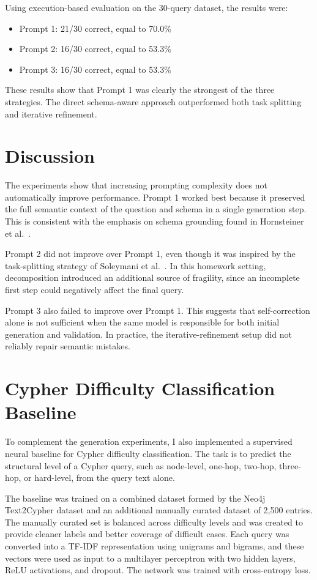\documentclass{article}
\begin{document}
Using execution-based evaluation on the 30-query dataset, the results were:
\begin{itemize}
    \item Prompt 1: 21/30 correct, equal to 70.0\%
    \item Prompt 2: 16/30 correct, equal to 53.3\%
    \item Prompt 3: 16/30 correct, equal to 53.3\%
\end{itemize}

These results show that Prompt 1 was clearly the strongest of the three strategies. The direct schema-aware approach outperformed both task splitting and iterative refinement.

\section{Discussion}

The experiments show that increasing prompting complexity does not automatically improve performance. Prompt 1 worked best because it preserved the full semantic context of the question and schema in a single generation step. This is consistent with the emphasis on schema grounding found in Hornsteiner et al.~\cite{hornsteiner2024realtime}.

Prompt 2 did not improve over Prompt 1, even though it was inspired by the task-splitting strategy of Soleymani et al.~\cite{soleymani2025tasksplitting}. In this homework setting, decomposition introduced an additional source of fragility, since an incomplete first step could negatively affect the final query.

Prompt 3 also failed to improve over Prompt 1. This suggests that self-correction alone is not sufficient when the same model is responsible for both initial generation and validation. In practice, the iterative-refinement setup did not reliably repair semantic mistakes.

\section{Cypher Difficulty Classification Baseline}

To complement the generation experiments, I also implemented a supervised neural baseline for Cypher difficulty classification. The task is to predict the structural level of a Cypher query, such as node-level, one-hop, two-hop, three-hop, or hard-level, from the query text alone.

The baseline was trained on a combined dataset formed by the Neo4j Text2Cypher dataset and an additional manually curated dataset of 2{,}500 entries. The manually curated set is balanced across difficulty levels and was created to provide cleaner labels and better coverage of difficult cases. Each query was converted into a TF-IDF representation using unigrams and bigrams, and these vectors were used as input to a multilayer perceptron with two hidden layers, ReLU activations, and dropout. The network was trained with cross-entropy loss.
\end{document}

